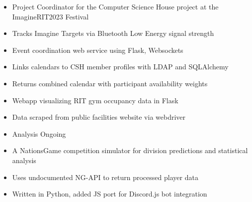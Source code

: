 \documentclass[10pt,a4paper,ragged2e,withhyper]{altacv}
\begin{document}
\begin{paracol}{2}


\begin{itemize}
    \item Project Coordinator for the Computer Science House project at the ImagineRIT2023 Festival
    \item Tracks Imagine Targets via Bluetooth Low Energy signal strength
\end{itemize}\par


\divider

\begin{itemize}
    \item Event coordination web service using Flask, Websockets
    \item Links calendars to CSH member profiles with LDAP and SQLAlchemy
    \item Returns combined calendar with participant availability weights
\end{itemize}

\divider

\begin{itemize}
    \item Webapp visualizing RIT gym occupancy data in Flask
    \item Data scraped from public facilities website via webdriver
    \item Analysis Ongoing
\end{itemize}

\divider


\begin{itemize}
    \item A NationsGame competition simulator for division predictions and statistical analysis
    \item Uses undocumented NG-API to return processed player data
    \item Written in Python, added JS port for Discord.js bot integration
\end{itemize}\par


\end{paracol}
\end{document}
